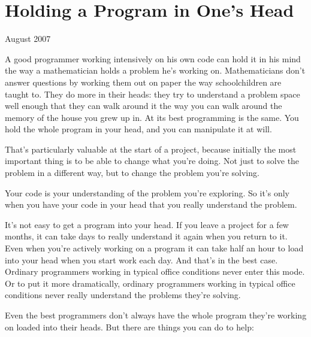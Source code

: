\chapter{Holding a Program in One's Head}



August 2007

A good programmer working intensively on his own code can hold it
in his mind the way a mathematician holds a problem he's working
on.  Mathematicians don't answer questions by working them out on
paper the way schoolchildren are taught to.  They do more in their
heads: they try to understand a problem space well enough that they
can walk around it the way you can walk around the memory of the
house you grew up in.  At its best programming is the same.  You
hold the whole program in your head, and you can manipulate it at
will.

That's particularly valuable at the start of a project, because
initially the most important thing is to be able to change what
you're doing.  Not just to solve the problem in a different way,
but to change the problem you're solving.

Your code is your understanding of the problem you're exploring.
So it's only when you have your code in your head that you really
understand the problem.

It's not easy to get a program into your head.  If you leave a
project for a few months, it can take days to really understand it
again when you return to it.  Even when you're actively working on
a program it can take half an hour to load into your head when you
start work each day.  And that's in the best case.  Ordinary
programmers working in typical office conditions never enter this
mode.  Or to put it more dramatically, ordinary programmers working
in typical office conditions never really understand the problems
they're solving.

Even the best programmers don't always have the whole program they're
working on loaded into their heads.   But there are things you can
do to help:

